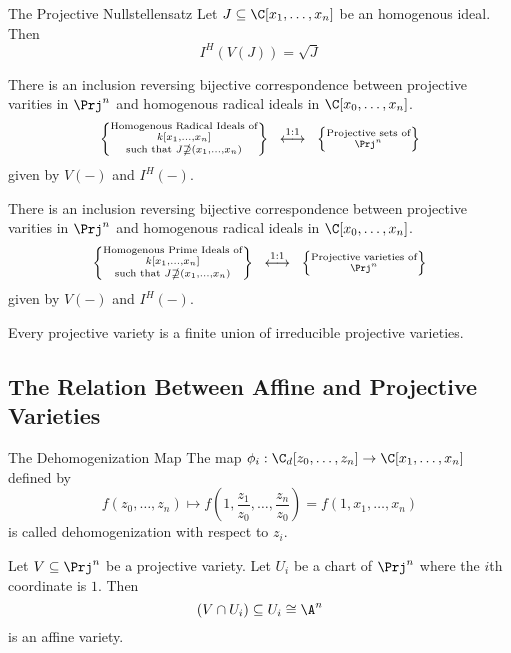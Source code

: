\documentclass[a4paper]{article}
\begin{document}
\begin{thm}{The Projective Nullstellensatz}{} Let $J\subseteq\C[x_1,\dots,x_n]$ be an homogenous ideal. Then $$I^H(V(J))=\sqrt{J}$$
\end{thm}

\begin{crl}{}{} There is an inclusion reversing bijective correspondence between projective varities in $\Prj^n$ and homogenous radical ideals in $\C[x_0,\dots,x_n]$. $$\left\{\substack{\text{Homogenous Radical Ideals of}\\ k[x_1,\dots,x_n]\\\text{such that }J\nsupseteq(x_1,\dots,x_n)}\right\}\;\;\overset{\text{1:1}}{\longleftrightarrow}\;\;\left\{\substack{\text{Projective sets of}\\ \Prj^n}\right\}$$ given by $V(-)$ and $I^H(-)$. 
\end{crl}

\begin{crl}{}{} There is an inclusion reversing bijective correspondence between projective varities in $\Prj^n$ and homogenous radical ideals in $\C[x_0,\dots,x_n]$. $$\left\{\substack{\text{Homogenous Prime Ideals of}\\ k[x_1,\dots,x_n]\\\text{such that }J\nsupseteq(x_1,\dots,x_n)}\right\}\;\;\overset{\text{1:1}}{\longleftrightarrow}\;\;\left\{\substack{\text{Projective varieties of}\\ \Prj^n}\right\}$$ given by $V(-)$ and $I^H(-)$. 
\end{crl}

\begin{prp}{}{} Every projective variety is a finite union of irreducible projective varieties. 
\end{prp}

\subsection{The Relation Between Affine and Projective Varieties}
\begin{defn}{The Dehomogenization Map}{} The map $\phi_i:\C_d[z_0,\dots,z_n]\to\C[x_1,\dots,x_n]$ defined by $$f(z_0,\dots,z_n)\mapsto f\left(1,\frac{z_1}{z_0},\dots,\frac{z_n}{z_0}\right)=f(1,x_1,\dots,x_n)$$ is called dehomogenization with respect to $z_i$. 
\end{defn}

\begin{lmm}{}{} Let $V\subseteq\Prj^n$ be a projective variety. Let $U_i$ be a chart of $\Prj^n$ where the $i$th coordinate is $1$. Then $$(V\cap U_i)\subseteq U_i\cong\A^n$$ is an affine variety. 
\end{lmm}
\end{document}
